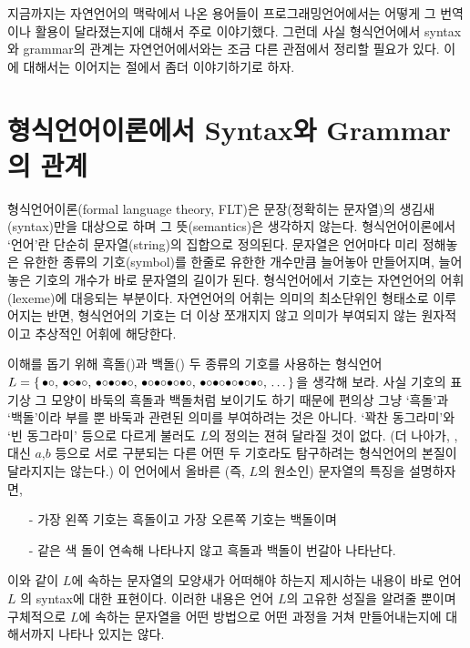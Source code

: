 지금까지는 자연언어의 맥락에서 나온 용어들이 프로그래밍언어에서는 어떻게
그 번역이나 활용이 달라졌는지에 대해서 주로 이야기했다. 그런데 사실
형식언어에서 syntax와 grammar의 관계는 자연언어에서와는 조금 다른 관점에서
정리할 필요가 있다. 이에 대해서는 이어지는 절에서 좀더 이야기하기로 하자.

\section{형식언어이론에서 Syntax와 Grammar의 관계}
\label{sec:FormalLangSG}
형식언어이론(formal language theory, FLT)은 문장(정확히는 문자열)의 생김새(syntax)만을
대상으로 하며 그 뜻(semantics)은 생각하지 않는다. 형식언어이론에서 `언어'란 단순히
문자열(string)의 집합으로 정의된다. 문자열은 언어마다 미리 정해놓은 유한한 종류의
기호(symbol)를 한줄로 유한한 개수만큼 늘어놓아 만들어지며, 늘어놓은 기호의 개수가
바로 문자열의 길이가 된다. 형식언어에서 기호는 자연언어의 어휘(lexeme)에 대응되는 부분이다.
자연언어의 어휘는 의미의 최소단위인 형태소로 이루어지는 반면,
형식언어의 기호는 더 이상 쪼개지지 않고 의미가 부여되지 않는
원자적이고 추상적인 어휘에 해당한다.

이해를 돕기 위해 흑돌(\txtbullet)과 백돌(\txtcircle) 두 종류의 기호를 사용하는 형식언어
$L = \{\, {\bullet\circ}
      ,\, {\bullet\circ}{\bullet\circ}
      ,\, {\bullet\circ}{\bullet\circ}{\bullet\circ}
      ,\, {\bullet\circ}{\bullet\circ}{\bullet\circ}{\bullet\circ}
      ,\, {\bullet\circ}{\bullet\circ}{\bullet\circ}{\bullet\circ}{\bullet\circ}
      ,\, \ldots
   \,\}$을 생각해 보라.
사실 기호의 표기상 그 모양이 바둑의 흑돌과 백돌처럼 보이기도 하기 때문에
편의상 그냥 `흑돌'과 `백돌'이라 부를 뿐 바둑과 관련된 의미를 부여하려는
것은 아니다. `꽉찬 동그라미'와 `빈 동그라미' 등으로 다르게 불러도
$L$의 정의는 젼혀 달라질 것이 없다. (더 나아가,
\txtbullet,\txtcircle 대신 $a$,$b$ 등으로 서로 구분되는
다른 어떤 두 기호라도 탐구하려는 형식언어의 본질이 달라지지는 않는다.)
이 언어에서 올바른 (즉, $L$의 원소인) 문자열의 특징을 설명하자면,\vspace{-1ex}
\begin{itemize}\tightlist
    \item[-] 가장 왼쪽 기호는 흑돌이고 가장 오른쪽 기호는 백돌이며
    \item[-] 같은 색 돌이 연속해 나타나지 않고 흑돌과 백돌이 번갈아 나타난다.
\end{itemize}
이와 같이 $L$에 속하는 문자열의 모양새가 어떠해야 하는지 제시하는 내용이
바로 언어 $L$ 의 syntax에 대한 표현이다. 이러한 내용은 언어 $L$의 고유한
성질을 알려줄 뿐이며 구체적으로 $L$에 속하는 문자열을 어떤 방법으로 어떤
과정을 거쳐 만들어내는지에 대해서까지 나타나 있지는 않다.

